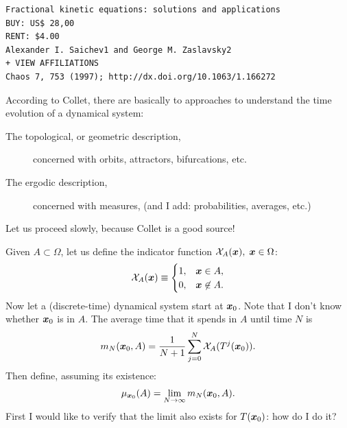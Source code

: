 \documentclass[12pt]{article}
\begin{document}
\begin{verbatim}
Fractional kinetic equations: solutions and applications
BUY: US$ 28,00
RENT: $4.00
Alexander I. Saichev1 and George M. Zaslavsky2
+ VIEW AFFILIATIONS
Chaos 7, 753 (1997); http://dx.doi.org/10.1063/1.166272
\end{verbatim}

According to Collet, there are basically to approaches to understand the time
evolution of a dynamical system:
\begin{description}
\item[The topological, or geometric description,] concerned with orbits,
  attractors, bifurcations, etc.
\item[The ergodic description,] concerned with measures, (and I add:
  probabilities, averages, etc.)
\end{description}

Let us proceed slowly, because Collet is a good source!

Given $A \subset \Omega$, let us define the indicator function $\mathord{\mathcal{X}}_A(\boldsymbol{x}),
\; \boldsymbol{x} \in \Omega$:
\[
\mathord{\mathcal{X}}_A(\boldsymbol{x}) \equiv \begin{cases}
   1, & \boldsymbol{x} \in A, \\
   0, & \boldsymbol{x} \not\in A.
\end{cases}
\]
Now let a (discrete-time) dynamical system start at $\boldsymbol{x}_0$.  
Note that I don't know whether $\boldsymbol{x}_0$ is in $A$.
The average
time that it spends in $A$ until time $N$ is
\begin{equation}
m_N(\boldsymbol{x}_0,A) = \frac{1}{N+1}\sum_{j=0}^N \mathord{\mathcal{X}}_A(T^j(\boldsymbol{x}_0)).
\end{equation}
Then define, assuming its existence:
\begin{equation}
\mu_{\boldsymbol{x}_0}(A) = \lim_{N\to\infty} m_N(\boldsymbol{x}_0,A). \label{eq:def-mu-x0A}
\end{equation}
First I would like to verify that the limit also exists for $T(\boldsymbol{x}_0)$: how
do I do it?
\end{document}
